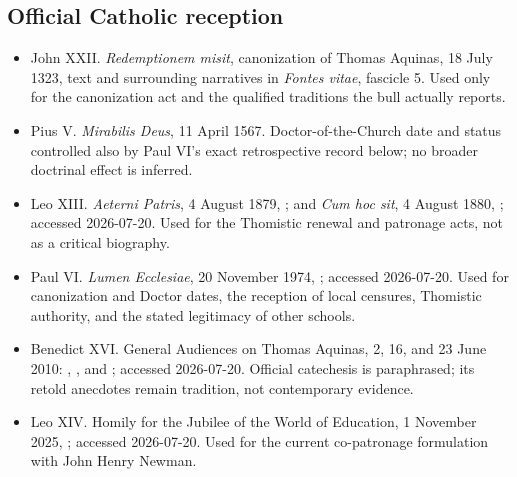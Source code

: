 \subsection{Official Catholic reception}

\begin{itemize}
\item John XXII.  \emph{Redemptionem misit}, canonization of Thomas Aquinas,
18 July 1323, text and surrounding narratives in \emph{Fontes vitae}, fascicle
5.  Used only for the canonization act and the qualified traditions the bull
actually reports.

\item Pius V.  \emph{Mirabilis Deus}, 11 April 1567.  Doctor-of-the-Church
date and status controlled also by Paul VI's exact retrospective record below;
no broader doctrinal effect is inferred.

\item Leo XIII.  \emph{Aeterni Patris}, 4 August 1879,
; and
\emph{Cum hoc sit}, 4 August 1880,
; accessed
2026-07-20.  Used for the Thomistic renewal and patronage acts, not as a
critical biography.

\item Paul VI.  \emph{Lumen Ecclesiae}, 20 November 1974,
; accessed
2026-07-20.  Used for canonization and Doctor dates, the reception of local
censures, Thomistic authority, and the stated legitimacy of other schools.

\item Benedict XVI.  General Audiences on Thomas Aquinas, 2, 16, and 23 June
2010:
,
, and
; accessed
2026-07-20.  Official catechesis is paraphrased; its retold anecdotes remain
tradition, not contemporary evidence.

\item Leo XIV.  Homily for the Jubilee of the World of Education, 1 November
2025,
; accessed
2026-07-20.  Used for the current co-patronage formulation with John Henry
Newman.


\end{itemize}
